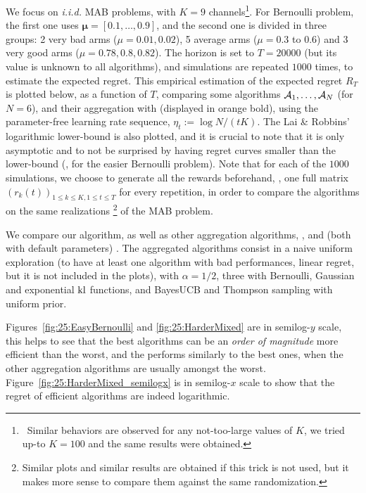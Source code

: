 We focus on \emph{i.i.d.} MAB problems, with $K = 9$ channels\footnote{~Similar behaviors are observed for any not-too-large values of $K$, we tried up-to $K = 100$ and the same results were obtained.}.
For Bernoulli problem, the first one uses $\boldsymbol{\mu}=[0.1,\dots,0.9]$,
and the second one is divided in three groups:
2 very bad arms ($\mu = 0.01, 0.02$), 5 average arms ($\mu = 0.3$ to $0.6$) and 3 very good arms ($\mu = 0.78, 0.8, 0.82$).
The horizon is set to $T = 20000$ (but its value is unknown to all algorithms), and simulations are repeated $1000$ times, to estimate the expected regret.
%
This empirical estimation of the expected regret $R_T$ is plotted below, as a function of $T$, comparing some algorithms $\mathcal{A}_1,\dots,\mathcal{A}_N$ (for $N=6$), and their aggregation with \Aggr{} (displayed in orange bold),
using the parameter-free learning rate sequence, $\eta_t := \log{N} / (t K)$.
The Lai \& Robbins' logarithmic lower-bound \cite{LaiRobbins85} is also plotted, and it is crucial to note that it is only asymptotic and to not be surprised by having regret curves smaller than the lower-bound (\eg, for the easier Bernoulli problem).
%
Note that for each of the $1000$ simulations, we choose to generate all the rewards beforehand, \ie, one full matrix $(r_k(t))_{1\leq k \leq K, 1 \leq t \leq T}$ for every repetition, in order to compare the algorithms on the same realizations%
\footnote{Similar plots and similar results are obtained if this trick is not used, but it makes more sense to compare them against the same randomization.}
of the MAB problem.

We compare our \Aggr{} algorithm,
as well as other aggregation algorithms, \ExpQ{},
\CORRAL{} and \LearnExp{} (both with default parameters) \cite{Bubeck12,Agarwal16,Singla17}.
The aggregated algorithms consist in a naive uniform exploration (to have at least one algorithm with bad performances, \ie{} linear regret, but it is not included in the plots),
\UCB{} with $\alpha=1/2$, three \klUCB{} with Bernoulli, Gaussian and exponential $\mathrm{kl}$ functions, and BayesUCB and Thompson sampling with uniform prior.

Figures~\ref{fig:25:EasyBernoulli} and \ref{fig:25:HarderMixed} are in semilog-$y$ scale, this helps to see that the best algorithms can be an \emph{order of magnitude} more efficient than the worst, and the \Aggr{} performs similarly to the best ones, when the other aggregation algorithms are usually amongst the worst.
Figure~\ref{fig:25:HarderMixed_semilogx} is in semilog-$x$ scale to show that the regret of efficient algorithms are indeed logarithmic.


